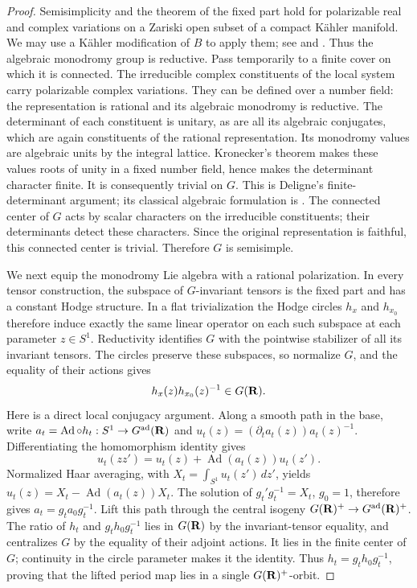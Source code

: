 \begin{proof}
Semisimplicity and the theorem of the fixed part hold for polarizable
real and complex variations on a Zariski open subset of a compact
Kähler manifold.  We may use a Kähler modification of $B$ to apply
them; see \cite[Lemma~2.3 and its proof]{PopaSchnellKahler} and
\cite[Theorem~3 and Remark~4]{BakkerMatsushita}.  Thus the algebraic
monodromy group is reductive.  Pass temporarily to a finite cover
on which it is connected.  The irreducible complex constituents of
the local system carry polarizable complex variations.  They can be
defined over a number field: the representation is rational and its
algebraic monodromy is reductive.  The determinant of each constituent
is unitary, as are all its algebraic conjugates, which are again
constituents of the rational representation.  Its monodromy values
are algebraic units by the integral lattice.  Kronecker's theorem
makes these values roots of unity in a fixed number field, hence
makes the determinant character finite.  It is consequently trivial
on $G$.  This is Deligne's finite-determinant argument; its classical
algebraic formulation is \cite[Corollary~4.2.8(iii)(b)]{DeligneHodgeII}.
The connected center of $G$ acts by scalar characters on
the irreducible constituents; their determinants detect these
characters.  Since the original representation is faithful, this
connected center is trivial.  Therefore $G$ is semisimple.

We next equip the monodromy Lie algebra with a rational polarization.
In every tensor construction,
the subspace of $G$-invariant tensors is the fixed part and has a
constant Hodge structure.  In a flat trivialization the Hodge circles
$h_x$ and $h_{x_0}$ therefore induce exactly the same linear operator
on each such subspace at each parameter $z\in S^1$.  Reductivity
identifies $G$ with the pointwise stabilizer of all its invariant
tensors.  The circles preserve these subspaces, so normalize $G$,
and the equality of their actions gives
\[
                    h_x(z)h_{x_0}(z)^{-1}\in G(\mathbf R).
\]
Here is a direct local conjugacy argument.  Along a smooth path in
the base, write $a_t=\operatorname{Ad}\circ h_t:S^1\to G^{\rm ad}(\mathbf R)$
and $u_t(z)=(\partial_t a_t(z))a_t(z)^{-1}$.  Differentiating the
homomorphism identity gives
\[
 u_t(zz')=u_t(z)+\operatorname{Ad}(a_t(z))u_t(z').
\]
Normalized Haar averaging, with $X_t=\int_{S^1}u_t(z')\,dz'$, yields
$u_t(z)=X_t-\operatorname{Ad}(a_t(z))X_t$.  The solution of
$g_t'g_t^{-1}=X_t$, $g_0=1$, therefore gives
$a_t=g_ta_0g_t^{-1}$.  Lift this path through the central isogeny
$G(\mathbf R)^+\to G^{\rm ad}(\mathbf R)^+$.  The ratio of $h_t$ and
$g_th_0g_t^{-1}$ lies in $G(\mathbf R)$ by the invariant-tensor equality,
and centralizes $G$ by the equality of their adjoint actions.
It lies in the finite center of $G$; continuity in the circle
parameter makes it the identity.  Thus $h_t=g_th_0g_t^{-1}$,
proving that the lifted period map lies in a single
$G(\mathbf R)^+$-orbit.


\end{proof}
